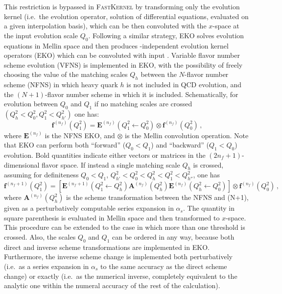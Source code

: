 This restriction is bypassed in \textsc{\small FastKernel} by transforming only the
evolution kernel (i.e.\ the evolution operator, solution of differential
equations, evaluated on a given interpolation basis), which can be then
convoluted with the $x$-space \pdfs at the input evolution scale $Q_0$.
Following a similar strategy, \textsc{\small EKO}
solves evolution equations in Mellin space and then produces \pdf-independent
evolution kernel operators (EKO) which can be convoluted with input 
\pdfs.
%
Variable flavor number scheme evolution (VFNS) is implemented in \textsc{\small EKO}, with
the possibility of freely choosing the value of the matching scales
$Q_{h}$ between the $N$-flavor number scheme (NFNS) in which heavy quark $h$
is not included in QCD evolution, and the $(N+1)$-flavor number
scheme in which it is included.
%
Schematically, for evolution between $Q_0$ and $Q_1$ if no matching
scales are crossed $\left(Q_{h}^2 < Q_0^2 , Q_1^2 < Q_{h'}^2\right)$ one has:
\begin{equation}
\label{eq:ic/EKO1}
{\mathbf{f}}^{(n_f)}(Q^2_1)= {\mathbf{E}}^{(n_f)}(Q^2_1\leftarrow Q^2_0) \otimes {\mathbf{f}}^{(n_f)}(Q^2_0) \, ,
\end{equation}
where
${\mathbf{E}}^{(n_f)}$ is the  NFNS \textsc{\small EKO},
and $\otimes$ is the Mellin convolution operation. Note that \textsc{\small EKO}
can perform both ``forward'' ($Q_0< Q_1$)  and ``backward'' ($Q_1< Q_0$)
evolution.
%
Bold quantities indicate either vectors or matrices
in the $(2n_f+1)$-dimensional flavor space.
If instead a single matching scale $Q_h$ is crossed, assuming for definiteness $Q_0< Q_1$,  
$Q_{h'}^2 < Q_0^2 < Q_{h}^2 < Q_1^2 < Q_{h''}^2$,
one has
\begin{equation}
\label{eq:ic/EKO2}
{\mathbf{f}}^{(n_f+1)}(Q^2_1)= \left[ {\mathbf{E}}^{(n_f+1)}(Q^2_1\leftarrow Q_{h}^2)  
{\mathbf{A}}^{(n_f)}(Q_{h}^2) {\mathbf{E}}^{(n_f)}(Q_{h}^2\leftarrow Q^2_0) \right] \otimes {\mathbf{f}}^{(n_f)}(Q^2_0) \, ,
\end{equation}
where $\mathbf{A}^{(n_f)}(Q_{h}^2)$ is the scheme transformation
between the NFNS and (N+1)\fns, given as a perturbatively computable
series expansion in $\alpha_s$. 
%
The quantity in square parenthesis is evaluated in Mellin space and then transformed to $x$-space.
%
This procedure can be  extended to the case in which  more than
one threshold is crossed.
%
Also, the scales $Q_0$ and $Q_1$ can be ordered in any way, because both direct
and inverse scheme transformations are implemented in
\textsc{\small EKO}. Furthermore, the inverse scheme change  is implemented both
perturbatively (i.e.\ as a series expansion in $\alpha_s$ to the same
accuracy as the direct scheme change) or exactly (i.e.\ as the numerical
inverse, completely equivalent to the analytic one within the numeral accuracy
of the rest of the calculation).

